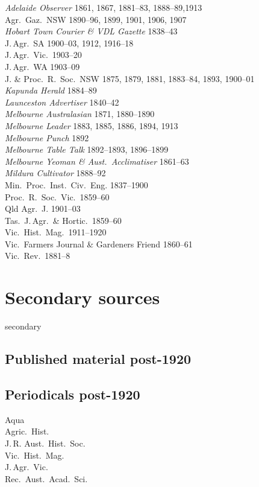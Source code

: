 {\textsl{Adelaide Observer} 1861, 1867, 1881--83, 1888--89,1913\\
Agr.\ Gaz.\ NSW  1890--96, 1899, 1901, 1906, 1907\\
\textsl{Hobart Town Courier \& VDL Gazette} 1838--43\\ 
J.\,Agr.\ SA 1900--03, 1912, 1916--18\\
J.\,Agr.\ Vic.\ 1903--20\\
J.\,Agr.\ WA 1903--09\\
J. \& Proc.\ R.~Soc.\ NSW 1875, 1879, 1881, 1883--84, 1893, 1900--01\\
\textsl{Kapunda Herald} 1884--89\\
\textsl{Launceston Advertiser} 1840--42\\
\textsl{Melbourne Australasian} 1871, 1880--1890\\
\textsl{Melbourne Leader} 1883, 1885, 1886, 1894, 1913\\
\textsl{Melbourne Punch} 1892\\
\textsl{Melbourne Table Talk} 1892--1893, 1896--1899\\
\textsl{Melbourne Yeoman \& Aust.\ Acclimatiser} 1861--63\\
\textsl{Mildura Cultivator} 1888--92\\
Min.\ Proc.\ Inst.\ Civ.\ Eng. 1837--1900\\
Proc.\ R.~Soc.\ Vic.\ 1859--60\\
Qld Agr.\ J. 1901--03\\
Tas.\ J.\,Agr.\ \& Hortic.\  1859--60\\
Vic.\ Hist.\ Mag.\ 1911--1920\\
Vic.\ Farmers Journal \& Gardeners Friend 1860--61\\
Vic.\ Rev.\ 1881--8\\

\section*{Secondary sources}

\begin{btSect}{secondary}
\subsection*{Published material post-1920}
\btPrintAll
\end{btSect}

\subsection*{Periodicals post-1920}

Aqua\\
Agric.\ Hist.\\
J.\,R. Aust.\ Hist.\ Soc.\\
Vic.\ Hist.\ Mag.\\
J.\,Agr.\ Vic.\\
Rec.\ Aust.\ Acad.\ Sci.\\

}
